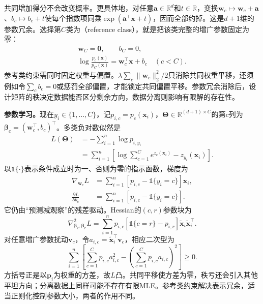 共同增加得分不会改变概率。更具体地，对任意$\bm{a}\in\mathbb{R}^{d}$和$t\in\mathbb{R}$，变换$\bm{w}_c\mapsto\bm{w}_c+\bm{a}$、$b_c\mapsto b_c+t$使每个指数项同乘$\exp(\bm{a}^{\top}\bm{x}+t)$，因而全部约掉。这是$d+1$维的参数冗余。选择第$C$类为（reference class），就是把该类完整的增广参数固定为零：
\begin{equation}
  \label{eq:classification-softmax-reference}
  \begin{gathered}
    \bm{w}_C=\bm{0},\qquad b_C=0,\\
    \log\frac{p_c(\bm{x})}{p_C(\bm{x})}
    =\bm{w}_c^{\top}\bm{x}+b_c
    \quad(c<C).
  \end{gathered}
\end{equation}
参考类约束需同时固定权重与偏置。$\lambda\sum_c\lVert\bm{w}_c\rVert_2^2/2$只消除共同权重平移，还须例如令$\sum_c b_c=0$或惩罚全部偏置，才能锁定共同偏置平移。参数冗余消除后，设计矩阵的秩决定数据能否区分剩余方向，数据分离则影响有限解的存在性。

\textbf{参数学习。}现在$y_i\in\{1,\ldots,C\}$，记$p_{i,c}=p_c(\bm{x}_i)$，$\bm{\Theta}\in\mathbb{R}^{(d+1)\times C}$的第$c$列为$\bm{\beta}_c=(\bm{w}_c^{\top},b_c)^{\top}$。多类负对数似然是
\begin{equation}
  \label{eq:classification-softmax-loss}
  \begin{aligned}
    L(\bm{\Theta})
      &=-\sum_{i=1}^{n}\log p_{i,y_i}\\
      &=\sum_{i=1}^{n}\left[
        \log\sum_{c=1}^{C}e^{z_c(\bm{x}_i)}
        -z_{y_i}(\bm{x}_i)\right].
  \end{aligned}
\end{equation}
以$\mathbb{1}\{\cdot\}$表示条件成立时为一、否则为零的指示函数，梯度为
\begin{equation}
  \label{eq:classification-softmax-gradient}
  \begin{aligned}
    \nabla_{\bm{w}_c}L
      &=\sum_{i=1}^{n}
        [p_{i,c}-\mathbb{1}\{y_i=c\}]\bm{x}_i,\\
    \frac{\partial L}{\partial b_c}
      &=\sum_{i=1}^{n}
        [p_{i,c}-\mathbb{1}\{y_i=c\}].
  \end{aligned}
\end{equation}
它仍由“预测减观察”的残差驱动。Hessian的$(c,r)$参数块为
\[
  \nabla^2_{\bm{\beta}_c,\bm{\beta}_r}L
  =\sum_{i=1}^{n}p_{i,c}
    [\mathbb{1}\{c=r\}-p_{i,r}]
    \tilde{\bm{x}}_i\tilde{\bm{x}}_i^{\top}.
\]
对任意增广参数扰动$\bm{v}_c$，令$a_{i,c}=\tilde{\bm{x}}_i^{\top}\bm{v}_c$，相应二次型为
\[
  \sum_{i=1}^{n}\left[
    \sum_{c=1}^{C}p_{i,c}a_{i,c}^2
    -\left(\sum_{c=1}^{C}p_{i,c}a_{i,c}\right)^2
  \right]\geq0.
\]
方括号正是以$\bm{p}_i$为权重的方差，故$L$凸。共同平移使方差为零，秩亏还会引入其他平坦方向；分离数据上同样可能不存在有限MLE。参考类约束解决表示冗余，适当正则化控制参数大小，两者的作用不同。

